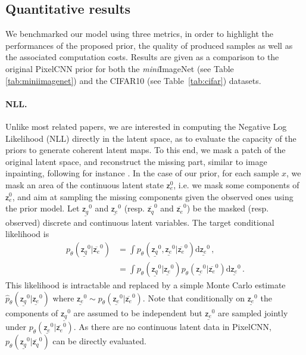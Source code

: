 \documentclass[nolayout]{article}
\theoremstyle{plain}
\theoremstyle{definition}
\theoremstyle{remark}
\newcommand{\latentcont}{\mathsf{z}_e}
\newcommand{\latentdis}{\mathsf{z}_q}
\begin{document}
\subsection{Quantitative results}
We benchmarked our model using three metrics, in order to highlight the performances of the proposed prior, the quality of produced samples as well as the associated computation costs.
Results are given as a comparison to the original PixelCNN prior for both the \textit{mini}ImageNet (see Table \ref{tab:miniimagenet}) and the CIFAR10 (see Table~\ref{tab:cifar}) datasets.

\paragraph{NLL. }\label{nll_paragraph}
Unlike most related papers, we are interested in computing the Negative Log Likelihood (NLL) directly in the latent space, as to evaluate the capacity of the priors to generate coherent latent maps.
To this end, we mask a patch of the original latent space, and reconstruct the missing part, similar to image inpainting, following for instance \cite{van2016pixel}.
 In the case of our prior, for each sample $x$, we mask an area of the continuous latent state $\latentcont^0$, i.e. we mask some components of $\latentcont^0$, and aim at sampling the missing components given the observed ones using the prior model. Let $\underline{\latentdis}^0$ and $\underline{\latentcont}^0$ (resp. $\overline{\latentdis}^0$ and $\overline{\latentcont}^0$) be the masked (resp. observed) discrete and continuous latent variables. The target conditional likelihood is
\begin{align*}
p_{\theta}(\underline{\latentdis}^0|\overline{\latentcont}^0) &= \int p_{\theta}(\underline{\latentdis}^0,\underline{\latentcont}^0|\overline{\latentcont}^0)\mathrm{d} \underline{\latentcont}^0\,,\\
&= \int p_{\theta}(\underline{\latentdis}^0|\underline{\latentcont}^0)p_{\theta}(\underline{\latentcont}^0|\overline{\latentcont}^0)\mathrm{d} \underline{\latentcont}^0\,.
\end{align*}
This likelihood is intractable and replaced by a simple Monte Carlo estimate $\hat{p}_{\theta}(\underline{\latentdis}^0|\underline{\latentcont}^0)$ where $\underline{\latentcont}^0\sim p_{\theta}(\underline{\latentcont}^0|\overline{\latentcont}^0)$. Note that conditionally on $\underline{\latentcont}^0$ the components of $\underline{\latentdis}^0$ are assumed to be independent but $\underline{\latentcont}^0$ are sampled jointly under $p_{\theta}(\underline{\latentcont}^0|\overline{\latentcont}^0)$. As there are no continuous latent data in PixelCNN, $p_{\theta}(\underline{\latentdis}^0|\overline{\latentdis}^0)$ can be directly evaluated.
\end{document}
